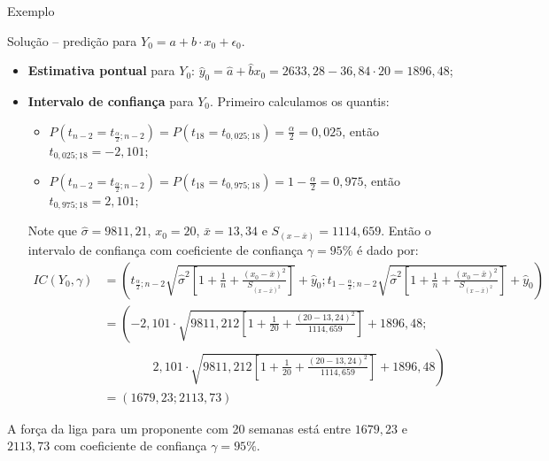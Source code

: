 \documentclass[8pt]{beamer}
\begin{document}
\begin{frame}{Exemplo}
\begin{block}{Solução -- predição para $Y_0 = a + b\cdot x_0 + \epsilon_0$.}
	\begin{itemize}
		\item \textbf{Estimativa pontual} para $Y_0$: $\hat{y}_0 = \hat{a} + \hat{b} x_0 = 2633,28 - 36,84 \cdot 20 = 1896,48$;
		
		\item \textbf{Intervalo de confiança} para $Y_0$. Primeiro calculamos os quantis:
		\begin{itemize}
			\item $P(t_{n-2} = t_{\frac{\alpha}{2};n-2}) = P(t_{18} = t_{0,025;18}) = \frac{\alpha}{2} = 0,025$, então $t_{0,025;18} = -2,101$;
			\item $P(t_{n-2} = t_{\frac{\alpha}{2};n-2}) = P(t_{18} = t_{0,975;18}) = 1-\frac{\alpha}{2} = 0,975$, então $t_{0,975;18} =  2,101$;
		\end{itemize}
		Note que $\hat{\sigma} = 9811,21$, $x_0 = 20$,  $\bar{x} = 13,34$ e $S_{(x-\bar{x})} = 1114,659$. Então o intervalo de confiança com coeficiente de confiança $\gamma = 95\%$ é dado por:
		\small
		\begin{align*}
			IC(Y_0, \gamma) &= \left( t_{\frac{\alpha}{2}; n-2} \sqrt{\hat{\sigma}^2 \left[ 1 + \frac{1}{n} + \frac{(x_0 - \bar{x})^2}{S_{(x - \bar{x})^2}} \right]} + \hat{y}_0; t_{1-\frac{\alpha}{2}; n-2} \sqrt{\hat{\sigma}^2 \left[ 1 + \frac{1}{n} + \frac{(x_0 - \bar{x})^2}{S_{(x - \bar{x})^2}} \right]} + \hat{y}_0 \right)\\
			&= \left(-2,101 \cdot \sqrt{9811,212 \left[ 1 + \frac{1}{20} + \frac{(20 - 13,24)^2}{1114,659}  \right]} + 1896,48;\right.\\
			&\qquad\qquad \left. 2,101 \cdot \sqrt{9811,212 \left[ 1 + \frac{1}{20} + \frac{(20 - 13,24)^2}{1114,659}  \right]} + 1896,48 \right) \\
			&= \left( 1679,23; 2113,73  \right)
		\end{align*} 
		\normalsize
	\end{itemize}	

	A força da liga para um proponente com 20 semanas está entre $1679,23$ e $2113,73$ com coeficiente de confiança $\gamma=95\%$.
\end{block}
\end{frame}
\end{document}
